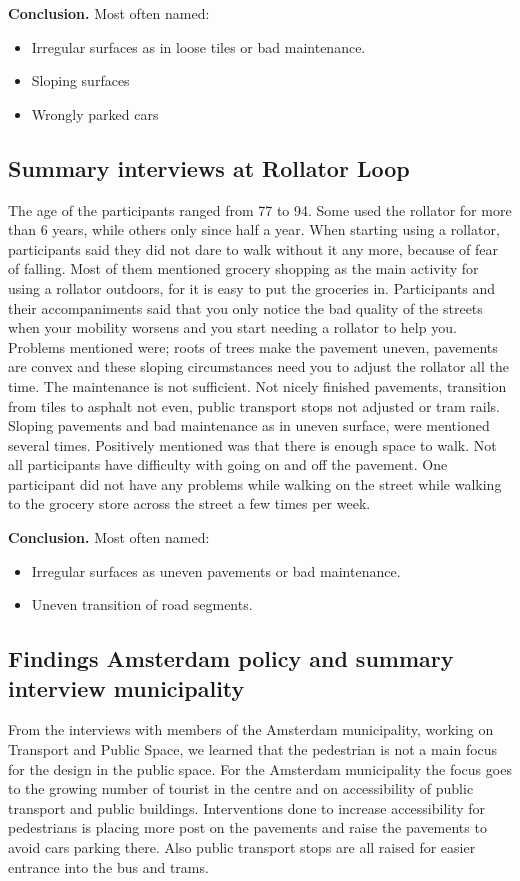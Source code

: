 \textbf{Conclusion.} Most often named: 
\begin{itemize}
\item Irregular surfaces as in loose tiles or bad maintenance. 
\item Sloping surfaces
\item Wrongly parked cars
\end{itemize}


\subsection{Summary interviews at Rollator Loop}
The age of the participants ranged from 77 to 94. Some used the rollator for more than 6 years, while others only since half a year. When starting using a rollator, participants said they did not dare to walk without it any more, because of fear of falling. Most of them mentioned grocery shopping as the main activity for using a rollator outdoors, for it is easy to put the groceries in. 
Participants and their accompaniments said that you only notice the bad quality of the streets when your mobility worsens and you start needing a rollator to help you. Problems mentioned were; roots of trees make the pavement uneven, pavements are convex and these sloping circumstances need you to adjust the rollator all the time. The maintenance is not sufficient. Not nicely finished pavements, transition from tiles to asphalt not even, public transport stops not adjusted or tram rails. Sloping pavements and bad maintenance as in uneven surface, were mentioned several times. Positively mentioned was that there is enough space to walk. Not all participants have difficulty with going on and off the pavement. One participant did not have any problems while walking on the street while walking to the grocery store across the street a few times per week. 

\textbf{Conclusion.} Most often named: 
\begin{itemize}
\item Irregular surfaces as uneven pavements or bad maintenance. 
\item Uneven transition of road segments.
\end{itemize}


\subsection{Findings Amsterdam policy and summary interview municipality}

From the interviews with members of the Amsterdam municipality, working on Transport and Public Space, we learned that the pedestrian is not a main focus for the design in the public space. For the Amsterdam municipality the focus goes to the growing number of tourist in the centre and on accessibility of public transport and public buildings. Interventions done to increase accessibility for pedestrians is placing more post on the pavements and raise the pavements to avoid cars parking there. Also public transport stops are all raised for easier entrance into the bus and trams. 

